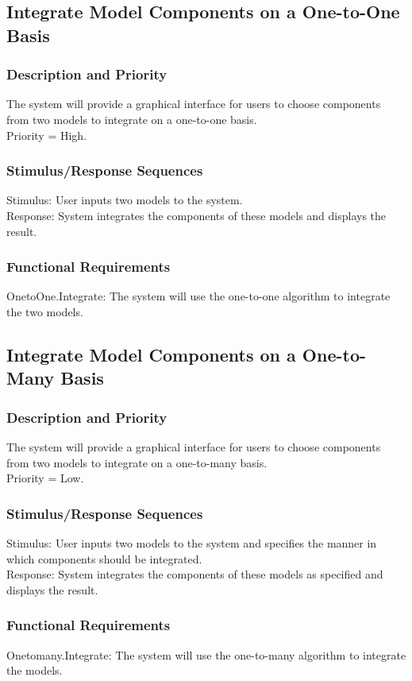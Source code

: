 \documentclass{article}
\begin{document}
\subsection{Integrate Model Components on a One-to-One Basis}
\subsubsection{Description and Priority}
The system will provide a graphical interface for users to choose components from two models to integrate on a one-to-one basis.\\
Priority = High.

\subsubsection{Stimulus/Response Sequences}
Stimulus: User inputs two models to the system.\\
Response: System integrates the components of these models and displays the result.

\subsubsection{Functional Requirements}
OnetoOne.Integrate: The system will use the one-to-one algorithm to integrate the two models.

\subsection{Integrate Model Components on a One-to-Many Basis}
\subsubsection{Description and Priority}
The system will provide a graphical interface for users to choose components from two models to integrate on a one-to-many basis.\\
Priority = Low.

\subsubsection{Stimulus/Response Sequences}
Stimulus: User inputs two models to the system and specifies the manner in which components should be integrated.\\
Response: System integrates the components of these models as specified and displays the result.

\subsubsection{Functional Requirements}
Onetomany.Integrate: The system will use the one-to-many algorithm to integrate the models.
\end{document}
